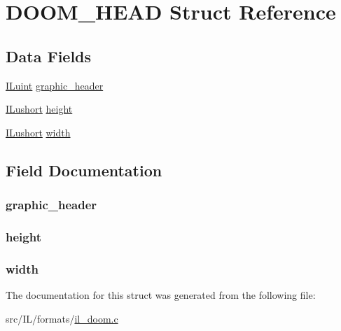 \hypertarget{struct_d_o_o_m___h_e_a_d}{\section{D\-O\-O\-M\-\_\-\-H\-E\-A\-D Struct Reference}
\label{struct_d_o_o_m___h_e_a_d}
}
\subsection*{Data Fields}
\begin{DoxyCompactItemize}
\item 
\hyperlink{il_8h_ac6508d0e9c19e32f32e00d54b5b8cf30}{I\-Luint} \hyperlink{struct_d_o_o_m___h_e_a_d_a3b59ec053d0c1e62759e0041f924771f}{graphic\-\_\-header}
\item 
\hyperlink{il_8h_af6287b43748354a7c4864da43ae56962}{I\-Lushort} \hyperlink{struct_d_o_o_m___h_e_a_d_af438fd5cd63e17e46ddda94e6832c1a1}{height}
\item 
\hyperlink{il_8h_af6287b43748354a7c4864da43ae56962}{I\-Lushort} \hyperlink{struct_d_o_o_m___h_e_a_d_ad747988d5758eb9e3ab73fdfeb17cf72}{width}
\end{DoxyCompactItemize}


\subsection{Field Documentation}
\hypertarget{struct_d_o_o_m___h_e_a_d_a3b59ec053d0c1e62759e0041f924771f}{
\subsubsection[{graphic\-\_\-header}]{ graphic\-\_\-header}}\label{struct_d_o_o_m___h_e_a_d_a3b59ec053d0c1e62759e0041f924771f}
\hypertarget{struct_d_o_o_m___h_e_a_d_af438fd5cd63e17e46ddda94e6832c1a1}{
\subsubsection[{height}]{ height}}\label{struct_d_o_o_m___h_e_a_d_af438fd5cd63e17e46ddda94e6832c1a1}
\hypertarget{struct_d_o_o_m___h_e_a_d_ad747988d5758eb9e3ab73fdfeb17cf72}{
\subsubsection[{width}]{ width}}\label{struct_d_o_o_m___h_e_a_d_ad747988d5758eb9e3ab73fdfeb17cf72}


The documentation for this struct was generated from the following file\-:\begin{DoxyCompactItemize}
\item 
src/\-I\-L/formats/\hyperlink{il__doom_8c}{il\-\_\-doom.\-c}\end{DoxyCompactItemize}
